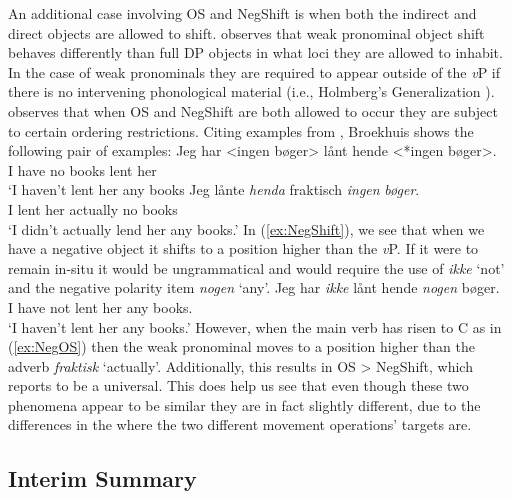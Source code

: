 \documentclass[12pt, letterpaper]{article}
\begin{document}
An additional case involving OS and NegShift is when both the indirect and direct objects are allowed to shift. \citet[417f]{broekhuisUnificationObjectShift2020} observes that weak pronominal object shift behaves differently than full DP objects in what loci they are allowed to inhabit. In the case of weak pronominals they are required to appear outside of the \textit{v}P if there is no intervening phonological material (i.e., Holmberg's Generalization \cite{holmbergWordOrderSyntactic1986,holmbergRemarksHolmbergGeneralization1999}). \citeauthor{broekhuisUnificationObjectShift2020} observes that when OS and NegShift are both allowed to occur they are subject to certain ordering restrictions. Citing examples from \citet[163ff]{christensenInterfacesNegationSyntax2005}, Broekhuis shows the following pair of examples:
	\ea 
		\ea \label{ex:NegShift}
		{\gll Jeg har <ingen bøger> lånt hende <*ingen bøger>.\\
		I have no books lent her\\}
		\glt `I haven't lent her any books
		\ex \label{ex:NegOS}
		\gll Jeg lånte \textit{henda} fraktisch \textit{ingen} \textit{bøger}.\\
		I lent her actually no books\\
		\glt `I didn't actually lend her any books.'
		\z 
	\z
In (\ref{ex:NegShift}), we see that when we have a negative object it shifts to a position higher than the \textit{v}P. If it were to remain in-situ it would be ungrammatical and would require the use of \textit{ikke} `not' and the negative polarity item \textit{nogen} `any'.
	\ea
	{\gll Jeg har \textit{ikke} lånt hende \textit{nogen} bøger.\\
	I have not lent her any books.\\}
	\glt `I haven't lent her any books.'
	\z
However, when the main verb has risen to C as in (\ref{ex:NegOS}) then the weak pronominal moves to a position higher than the adverb \textit{fraktisk} `actually'. Additionally, this results in OS > NegShift, which \citeauthor{broekhuisUnificationObjectShift2020} reports to be a universal. This does help us see that even though these two phenomena appear to be similar they are in fact slightly different, due to the differences in the where the two different movement operations' targets are.

\subsection{Interim Summary} \label{sec:SUMMARY}
\end{document}
